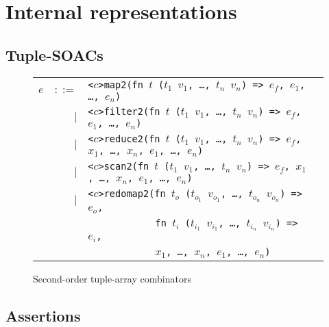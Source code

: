 \chapter{Internal representations}
\label{chap:internal}

\section{Tuple-SOACs}

\begin{figure}[bt]
\begin{tabular}{lrll}
$e$ & $::=$ & \texttt{<$c$>map2(fn $t$ ($t_{1}$ $v_{1}$, \ldots, $t_{n}$ $v_{n}$) => $e_f$, $e_{1}$, \ldots, $e_{n}$)} \\
    & $|$ & \texttt{<$c$>filter2(fn $t$ ($t_{1}$ $v_{1}$, \ldots, $t_{n}$ $v_{n}$) => $e_f$, $e_{1}$, \ldots, $e_{n}$)} \\
    & $|$ & \texttt{<$c$>reduce2(fn $t$ ($t_{1}$ $v_{1}$, \ldots, $t_{n}$ $v_{n}$) => $e_f$, $x_{1}$, \ldots, $x_{n}$, $e_{1}$, \ldots, $e_{n}$)} \\
    & $|$ & \texttt{<$c$>scan2(fn $t$ ($t_{1}$ $v_{1}$, \ldots, $t_{n}$ $v_{n}$) => $e_f$, $x_{1}$, \ldots, $x_{n}$, $e_{1}$, \ldots, $e_{n}$)} \\
    & $|$ & \texttt{<$c$>redomap2(fn $t_{o}$ ($t_{o_{1}}$ $v_{o_{1}}$, \ldots, $t_{o_{n}}$ $v_{o_{n}}$) => $e_o$,} \\
    &     & \texttt{\ \ \ \ \ \ \ \ \ \ \ \ fn $t_{i}$ ($t_{i_{1}}$ $v_{i_{1}}$, \ldots, $t_{i_{n}}$ $v_{i_{n}}$) => $e_i$,} \\
    &     & \texttt{\ \ \ \ \ \ \ \ \ \ \ \ $x_{1}$, \ldots, $x_{n}$, $e_{1}$, \ldots, $e_{n}$)} \\
\end{tabular}
\caption{Second-order tuple-array combinators}
\label{fig:tuple-soacs}
\end{figure}

\section{Assertions}

